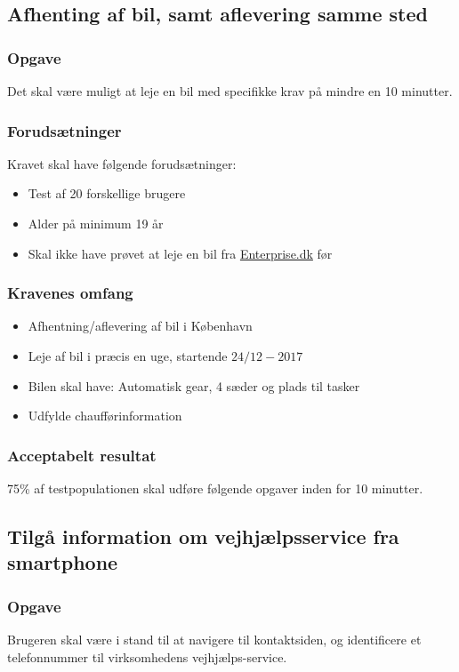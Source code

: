 \documentclass[a4paper,10pt]{article}
\begin{document}
\subsection{Afhenting af bil, samt aflevering samme sted}
\subsubsection{Opgave}
Det skal være muligt at leje en bil med specifikke krav på mindre en 10 minutter.

\subsubsection{Forudsætninger}
Kravet skal have følgende forudsætninger:
\begin{itemize}
    \item {Test af 20 forskellige brugere}
    \item {Alder på minimum 19 år}
    \item {Skal ikke have prøvet at leje en bil fra \href{http://Enterprise.dk}{Enterprise.dk} før}
\end{itemize}

\subsubsection{Kravenes omfang}

\begin{itemize}
    \item {Afhentning/aflevering af bil i København}
    \item {Leje af bil i præcis en uge, startende $24/12-2017$}
    \item {Bilen skal have: Automatisk gear, 4 sæder og plads til tasker}
    \item {Udfylde chaufførinformation}
\end{itemize}

\subsubsection{Acceptabelt resultat}
75\% af testpopulationen skal udføre følgende opgaver inden for 10 minutter.

\subsection{Tilgå information om vejhjælpsservice fra smartphone}
\subsubsection{Opgave}
Brugeren skal være i stand til at navigere til kontaktsiden, og identificere et telefonnummer til virksomhedens vejhjælps-service. 
\end{document}
